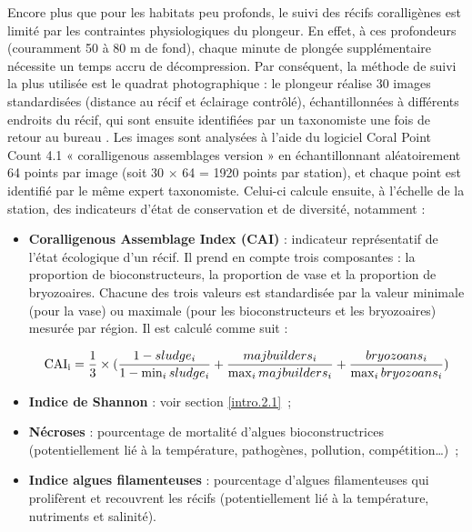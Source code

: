Encore plus que pour les habitats peu profonds, le suivi des récifs coralligènes est limité par les contraintes physiologiques du plongeur. En effet, à ces profondeurs (couramment 50 à 80 m de fond), chaque minute de plongée supplémentaire nécessite un temps accru de décompression. Par conséquent, la méthode de suivi la plus utilisée est le quadrat photographique : le plongeur réalise 30 images standardisées (distance au récif et éclairage contrôlé), échantillonnées à différents endroits du récif, qui sont ensuite identifiées par un taxonomiste une fois de retour au bureau \citep{deter_rapid_2012}. Les images sont analysées à l’aide du logiciel Coral Point Count \citep{cpce_coral_2011} 4.1 « coralligenous assemblages version » en échantillonnant aléatoirement 64 points par image (soit 30 $\times$ 64 = 1920 points par station), et chaque point est identifié par le même expert taxonomiste. Celui-ci calcule ensuite, à l’échelle de la station, des indicateurs d’état de conservation et de diversité, notamment :

\begin{itemize}
    \item \textbf{Coralligenous Assemblage Index (CAI)} \citep{deter_preliminary_2012} : indicateur représentatif de l’état écologique d’un récif. Il prend en compte trois composantes : la proportion de bioconstructeurs, la proportion de vase et la proportion de bryozoaires. Chacune des trois valeurs est standardisée par la valeur minimale (pour la vase) ou maximale (pour les bioconstructeurs et les bryozoaires) mesurée par région. Il est calculé comme suit :
    
    \begin{equation}
        \text{CAI\textsubscript{i}}=\frac{1}{3}\times(\frac{1-sludge_i}{1-\min_{i}sludge_i}+\frac{majbuilders_i}{\max_{i}majbuilders_i}+\frac{bryozoans_i}{\max_{i}bryozoans_i})
        \label{eqintro.2}
    \end{equation}
    
    \item \textbf{Indice de Shannon} \citep{magurran_measuring_2004} : voir section \ref{intro.2.1}~;
    
    \item \textbf{Nécroses} : pourcentage de mortalité d’algues bioconstructrices (potentiellement lié à la température, pathogènes, pollution, compétition…)~;
    
    \item \textbf{Indice algues filamenteuses} : pourcentage d’algues filamenteuses qui prolifèrent et recouvrent les récifs (potentiellement lié à la température, nutriments et salinité).

\end{itemize}

